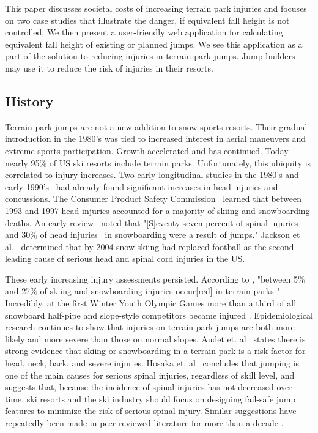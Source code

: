 \documentclass{article}
\begin{document}
This paper discusses societal costs of increasing terrain park injuries and
focuses on two case studies that illustrate the danger, if equivalent fall
height is not controlled. We then present a user-friendly web application for
calculating equivalent fall height of existing or planned jumps. We see this
application as a part of the solution to reducing injuries in terrain park
jumps. Jump builders may use it to reduce the risk of injuries in their
resorts.

\subsection{History}
%
Terrain park jumps are not a new addition to snow sports resorts. Their gradual
introduction in the 1980's was tied to increased interest in aerial maneuvers
and extreme sports participation. Growth accelerated and has continued.  Today
nearly 95\% of US ski resorts include terrain parks. Unfortunately, this
ubiquity is correlated to injury increases.  Two early longitudinal studies  in
the 1980's and early 1990's~\cite{Deibert1998,Furrer1995} had already found
significant increases in head injuries and concussions. The Consumer Product
Safety Commission~\cite{CPSC1999} learned that between 1993 and 1997 head injuries accounted
for a majority of skiing
and snowboarding deaths. An early review~\cite{Koehle2002} noted that "[S]eventy-seven
percent of spinal injuries~\cite{Tarazi1999} and 30\% of head
injuries~\cite{Fukada2001}
in snowboarding were a result of jumps." Jackson et al.~\cite{Jackson2004}
determined that by 2004 snow skiing had replaced football as the second leading
cause of serious head and spinal cord injuries in the US.

These early increasing injury assessments persisted. According to
\cite{Russell2014}, "between 5\% and 27\% of skiing and snowboarding injuries
occur[red] in terrain parks \cite{Bridges2003, Goulet2007,  Moffat2009,
Greve2009, Brooks2010,Ruedl2013}".  Incredibly, at the first Winter Youth
Olympic Games more than a third of all snowboard half-pipe and slope-style
competitors became injured \cite{Ruedl2012}. Epidemiological research
continues to show \cite{Carus2016,Audet2019a, Hosaka2020} that injuries on
terrain park jumps are both more likely and more severe than those on normal
slopes. Audet et. al~\cite{Audet2019a} states  there is strong evidence that
skiing or snowboarding in a terrain park is a risk factor for head, neck,
back, and severe injuries. Hosaka et. al~\cite{Hosaka2020} concludes that
jumping is one of the main causes for serious spinal injuries, regardless of
skill level, and suggests that, because the incidence of spinal injuries has
not decreased over time, ski resorts and the ski industry should focus on
designing fail-safe jump features to minimize the risk of serious spinal
injury.  Similar suggestions have repeatedly been made in peer-reviewed
literature for more than a decade
\cite{Hubbard2009,Swedberg2012,McNeil2012,McNeil2012a,McNeil2015,Hubbard2015,
Levy2015,Petrone2017,Moore2018}.
\end{document}
